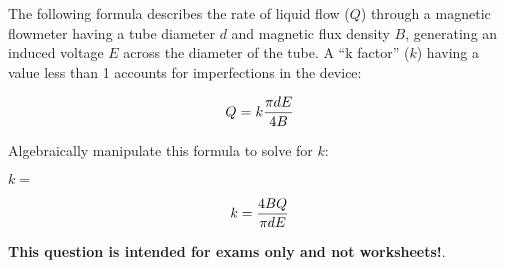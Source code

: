 

The following formula describes the rate of liquid flow ($Q$) through a magnetic flowmeter having a tube diameter $d$ and magnetic flux density $B$, generating an induced voltage $E$ across the diameter of the tube.  A ``k factor'' ($k$) having a value less than 1 accounts for imperfections in the device:

$$Q = k {\pi d E \over 4 B}$$

Algebraically manipulate this formula to solve for $k$:

\vskip 20pt

$k = $







$$k = {4 B Q \over \pi d E}$$







{\bf This question is intended for exams only and not worksheets!}.



